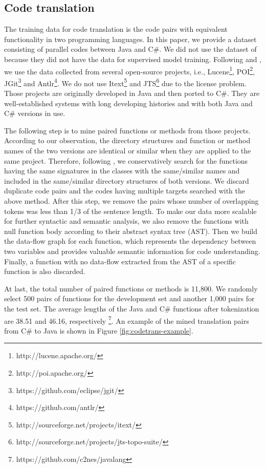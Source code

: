 \documentclass[sigconf,nonacm,screen]{acmart}
\begin{document}
\subsection{Code translation}
\label{code_translation}
The training data for code translation is the code pairs with equivalent functionality
in two programming languages. In this paper, we provide a dataset consisting of parallel codes between Java and C\#. We did not use the dataset of \citet{lachaux2020unsupervised} because they did not have the data for supervised model training.
Following \citet{nguyen2015divide} and \citet{chen2018tree}, we use the data collected from several open-source projects, i.e., Lucene\footnote{http://lucene.apache.org/}, POI\footnote{http://poi.apache.org/}, JGit\footnote{https://github.com/eclipse/jgit/}  and Antlr\footnote{https://github.com/antlr/}. We do not use Itext\footnote{http://sourceforge.net/projects/itext/} and JTS\footnote{http://sourceforge.net/projects/jts-topo-suite/} due to the license problem. 
Those projects are originally developed in Java and then ported to C\#. They are well-established systems with long developing histories and with both Java and C\# versions in use. 

The following step is to mine paired functions or methods from those projects. According to our observation, the directory structures and function or method names of the two versions are identical or similar when they are applied to the same project. Therefore, following \citet{nguyen2015divide}, we conservatively search for the functions having the same signatures in the classes with the same/similar names and included in the same/similar directory structures of both versions. We discard duplicate code pairs and the codes having multiple targets searched with the above method. After this step, we remove the pairs whose number of overlapping tokens was less than 1/3 of the sentence length. To make our data more scalable for further syntactic and semantic analysis, we also remove the functions with null function body according to their abstract syntax tree (AST). Then we build the data-flow graph \cite{guo2020graphcodebert} for each function, which represents the dependency between two variables and provides valuable semantic information for code understanding. 
Finally, a function with no data-flow extracted from the AST of a specific function is also discarded.

At last, the total number of paired functions or methods is 11,800. We randomly select 500 pairs of functions for the development set and another 1,000 pairs for the test set. The average lengths of the Java and C\# functions after tokenization are 38.51 and 46.16, respectively \footnote{https://github.com/c2nes/javalang}. An example of the mined translation pairs from C\# to Java is shown in Figure \ref{fig:codetrans-example}.
\end{document}
